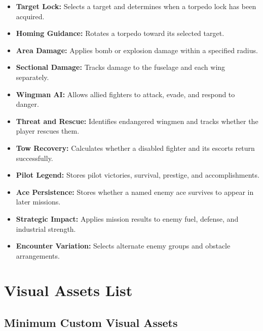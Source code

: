\documentclass[journal]{IEEEtran}
\begin{document}
\begin{itemize}

    \item \textbf{Target Lock:}
    Selects a target and determines when a torpedo lock has been acquired.

    \item \textbf{Homing Guidance:}
    Rotates a torpedo toward its selected target.

    \item \textbf{Area Damage:}
    Applies bomb or explosion damage within a specified radius.

    \item \textbf{Sectional Damage:}
    Tracks damage to the fuselage and each wing separately.

    \item \textbf{Wingman AI:}
    Allows allied fighters to attack, evade, and respond to danger.

    \item \textbf{Threat and Rescue:}
    Identifies endangered wingmen and tracks whether the player rescues them.

    \item \textbf{Tow Recovery:}
    Calculates whether a disabled fighter and its escorts return successfully.

    \item \textbf{Pilot Legend:}
    Stores pilot victories, survival, prestige, and accomplishments.

    \item \textbf{Ace Persistence:}
    Stores whether a named enemy ace survives to appear in later missions.

    \item \textbf{Strategic Impact:}
    Applies mission results to enemy fuel, defense, and industrial strength.

    \item \textbf{Encounter Variation:}
    Selects alternate enemy groups and obstacle arrangements.

\end{itemize}


\section{Visual Assets List}

\subsection{Minimum Custom Visual Assets}
\end{document}
